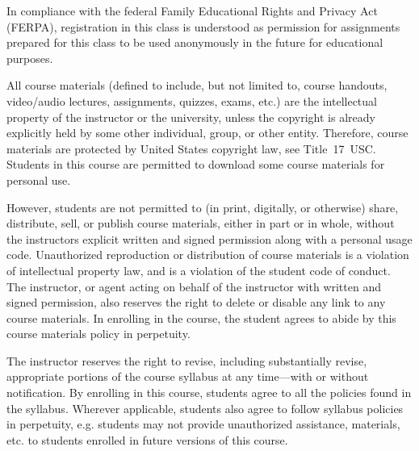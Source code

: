 \documentclass[11pt,letterpaper]{article}
\begin{document}
\newpage






In compliance with the federal Family Educational Rights and Privacy Act (FERPA), registration in this class is understood as permission for assignments prepared for this class to be used anonymously in the future for educational purposes.
\sectionbreak




All course materials (defined to include, but not limited to, course handouts, video/audio lectures, assignments, quizzes, exams, etc.) are the intellectual property of the instructor or the university, unless the copyright is already explicitly held by some other individual, group, or other entity. Therefore, course materials are protected by United States copyright law, see Title~17~USC. Students in this course are permitted to download some course materials for personal use. \pspace

However, students are not permitted to (in print, digitally, or otherwise) share, distribute, sell, or publish course materials, either in part or in whole, without the instructors explicit written and signed permission along with a personal usage code. Unauthorized reproduction or distribution of course materials is a violation of intellectual property law, and is a violation of the student code of conduct. The instructor, or agent acting on behalf of the instructor with written and signed permission, also reserves the right to delete or disable any link to any course materials. In enrolling in the course, the student agrees to abide by this course materials policy in perpetuity.
\sectionbreak




The instructor reserves the right to revise, including substantially revise, appropriate portions of the course syllabus at any time---with or without notification. By enrolling in this course, students agree to all the policies found in the syllabus. Wherever applicable, students also agree to follow syllabus policies in perpetuity, e.g. students may not provide unauthorized assistance, materials, etc. to students enrolled in future versions of this course. 
\sectionbreak
\end{document}
